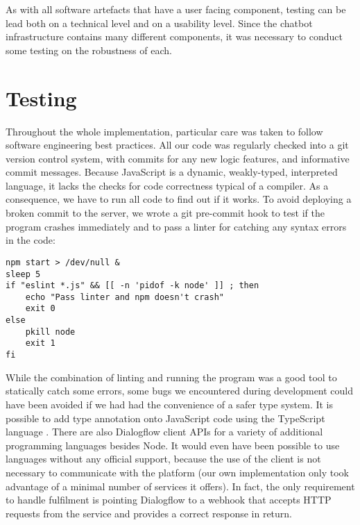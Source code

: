 As with all software artefacts that have a user facing component, testing can be lead both on a technical level and on a usability level. Since the chatbot infrastructure contains many different components, it was necessary to conduct some testing on the robustness of each.
\section{Testing}
Throughout the whole implementation, particular care was taken to follow software engineering best practices. All our code was regularly checked into a git version control system, with commits for any new logic features, and informative commit messages. Because JavaScript is a dynamic, weakly-typed, interpreted language, it lacks the checks for code correctness typical of a compiler. As a consequence, we have to run all code to find out if it works. To avoid deploying a broken commit to the server, we wrote a git pre-commit hook to test if the program crashes immediately and to pass a linter for catching any syntax errors in the code:
\begin{lstlisting}[upquote=true]
npm start > /dev/null &
sleep 5
if "eslint *.js" && [[ -n 'pidof -k node' ]] ; then
    echo "Pass linter and npm doesn't crash"
    exit 0
else
    pkill node
    exit 1
fi
\end{lstlisting}
While the combination of linting and running the program was a good tool to statically catch some errors, some bugs we encountered during development could have been avoided if we had had the convenience of a safer type system. It is possible to add type annotation onto JavaScript code using the TypeScript language \cite{typescript}. There are also Dialogflow client APIs for a variety of additional programming languages besides Node. It would even have been possible to use languages without any official support, because the use of the client is not necessary to communicate with the platform (our own implementation only took advantage of a minimal number of services it offers). In fact, the only requirement to handle fulfilment is pointing Dialogflow to a webhook that accepts HTTP requests from the service and provides a correct response in return. 

